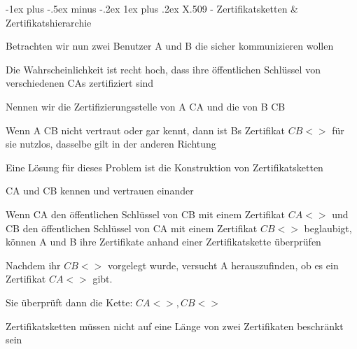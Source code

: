 \documentclass[a4paper]{article}
\makeatletter
\renewcommand{\subsubsection}{\@startsection{subsubsection}{3}{0mm}%
 {-1ex plus -.5ex minus -.2ex}%
 {1ex plus .2ex}%
 {\normalfont\small\bfseries}}
\makeatother
\begin{document}
\begin{multicols}{3}
      \subsubsection{X.509 - Zertifikatsketten \& Zertifikatshierarchie}
      \begin{itemize*}
            \item Betrachten wir nun zwei Benutzer A und B die sicher kommunizieren wollen
            \begin{itemize*}
                  \item Die Wahrscheinlichkeit ist recht hoch, dass ihre öffentlichen Schlüssel von verschiedenen CAs zertifiziert sind
                  \item Nennen wir die Zertifizierungsstelle von A CA und die von B CB
                  \item Wenn A CB nicht vertraut oder gar kennt, dann ist Bs Zertifikat $CB<>$ für sie nutzlos, dasselbe gilt in der anderen Richtung
            \end{itemize*}
            \item Eine Lösung für dieses Problem ist die Konstruktion von Zertifikatsketten
            \begin{itemize*}
                  \item CA und CB kennen und vertrauen einander
                  \item Wenn CA den öffentlichen Schlüssel von CB mit einem Zertifikat $CA<>$ und CB den öffentlichen Schlüssel von CA mit einem Zertifikat $CB<>$ beglaubigt, können A und B ihre Zertifikate anhand einer Zertifikatskette überprüfen
                  \item Nachdem ihr $CB<>$ vorgelegt wurde, versucht A herauszufinden, ob es ein Zertifikat $CA<>$ gibt.
                  \item Sie überprüft dann die Kette: $CA<>, CB<>$
            \end{itemize*}
            \item Zertifikatsketten müssen nicht auf eine Länge von zwei Zertifikaten beschränkt sein

\end{itemize*}
\end{multicols}
\end{document}
